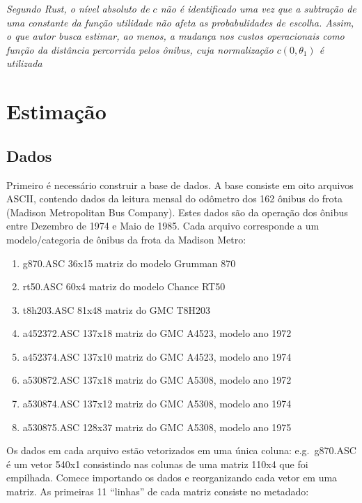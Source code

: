 \documentclass[12pt,a4paper]{article}
\providecommand{\tightlist}{%
  \setlength{\itemsep}{0pt}\setlength{\parskip}{0pt}}
\begin{document}
\emph{Segundo Rust, o nível absoluto de \(c\) não é identificado uma vez
que a subtração de uma constante da função utilidade não afeta as
probabulidades de escolha. Assim, o que autor busca estimar, ao menos, a
mudança nos custos operacionais como função da distância percorrida
pelos ônibus, cuja normalização \(c(0,\theta_1)\) é utilizada}

\hypertarget{estimacao}{%
\section{Estimação}\label{estimacao}}

\hypertarget{dados}{%
\subsection{Dados}\label{dados}}

Primeiro é necessário construir a base de dados. A base consiste em oito
arquivos ASCII, contendo dados da leitura mensal do odômetro dos 162
ônibus do frota (Madison Metropolitan Bus Company). Estes dados são da
operação dos ônibus entre Dezembro de 1974 e Maio de 1985. Cada arquivo
corresponde a um modelo/categoria de ônibus da frota da Madison Metro:

\begin{enumerate}
\def\labelenumi{\arabic{enumi}.}
\tightlist
\item
  g870.ASC 36x15 matriz do modelo Grumman 870
\item
  rt50.ASC 60x4 matriz do modelo Chance RT50
\item
  t8h203.ASC 81x48 matriz do GMC T8H203
\item
  a452372.ASC 137x18 matriz do GMC A4523, modelo ano 1972
\item
  a452374.ASC 137x10 matriz do GMC A4523, modelo ano 1974
\item
  a530872.ASC 137x18 matriz do GMC A5308, modelo ano 1972
\item
  a530874.ASC 137x12 matriz do GMC A5308, modelo ano 1974
\item
  a530875.ASC 128x37 matriz do GMC A5308, modelo ano 1975
\end{enumerate}

Os dados em cada arquivo estão vetorizados em uma única coluna:
e.g.~g870.ASC é um vetor 540x1 consistindo nas colunas de uma matriz
110x4 que foi empilhada. Comece importando os dados e reorganizando cada
vetor em uma matriz. As primeiras 11 ``linhas'' de cada matriz consiste
no metadado:
\end{document}
